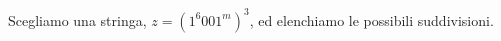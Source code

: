 \documentclass[a4paper,oneside]{scrbook}
\begin{document}
Scegliamo una stringa, $z=(1^{6}001^m)^3$, ed elenchiamo le possibili suddivisioni.
%	
%	
%	
%	
%	
%	
%	
%	
%	
%	
%	
%	
%	
%	
%	
%	
%	
%	
\end{document}

